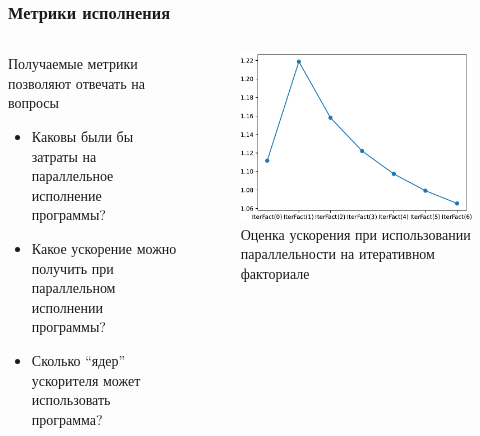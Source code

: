 \documentclass
  [ russian
  , aspectratio=169 %
  ] {beamer}
\begin{document}
\begin{frame}
    \frametitle{Метрики исполнения}

    \begin{columns}
        \begin{column}{0.45\linewidth}
            Получаемые метрики позволяют отвечать на вопросы
            \begin{itemize}
                \item Каковы были бы затраты на параллельное исполнение программы?
                \item Какое ускорение можно получить при параллельном исполнении программы?
                \item Сколько \enquote{ядер} ускорителя может использовать программа?
            \end{itemize}
        \end{column}
        \begin{column}{0.5\linewidth}
            \begin{figure}
                \begin{center}
                    \includegraphics[width=\linewidth, page=2]{figures/Figures_cropped.pdf}
                \end{center}
                \caption{Оценка ускорения при использовании параллельности на итеративном факториале}
            \end{figure}
        \end{column}
    \end{columns}

\end{frame}
\end{document}
